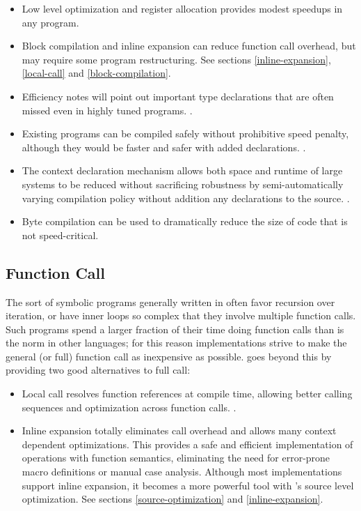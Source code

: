 \begin{itemize} 
\item Low level optimization and register allocation provides modest
  speedups in any program.
  
\item Block compilation and inline expansion can reduce function call
  overhead, but may require some program restructuring.  See sections
  \ref{inline-expansion}, \ref{local-call} and
  \ref{block-compilation}.
  
\item Efficiency notes will point out important type declarations that
  are often missed even in highly tuned programs.
  .
  
\item Existing programs can be compiled safely without prohibitive
  speed penalty, although they would be faster and safer with added
  declarations.  .
  
\item The context declaration mechanism allows both space and runtime
  of large systems to be reduced without sacrificing robustness by
  semi-automatically varying compilation policy without addition any
   declarations to the source.
  .
  
\item Byte compilation can be used to dramatically reduce the size of
  code that is not speed-critical. 
\end{itemize}


\subsection{Function Call}

The sort of symbolic programs generally written in \llisp{} often
favor recursion over iteration, or have inner loops so complex that
they involve multiple function calls.  Such programs spend a larger
fraction of their time doing function calls than is the norm in other
languages; for this reason \llisp{} implementations strive to make the
general (or full) function call as inexpensive as possible.  \python{}
goes beyond this by providing two good alternatives to full call:

\begin{itemize} 
\item Local call resolves function references at compile time,
  allowing better calling sequences and optimization across function
  calls.  .
  
\item Inline expansion totally eliminates call overhead and allows
  many context dependent optimizations.  This provides a safe and
  efficient implementation of operations with function semantics,
  eliminating the need for error-prone macro definitions or manual
  case analysis.  Although most \clisp{} implementations support
  inline expansion, it becomes a more powerful tool with \python{}'s
  source level optimization.  See sections \ref{source-optimization}
  and \ref{inline-expansion}.
\end{itemize}


